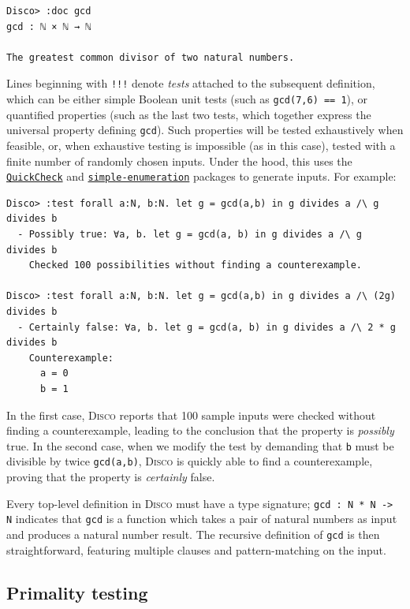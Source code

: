 \documentclass[copyright,creativecommons,12pt]{eptcs}
\newcommand{\disco}{\textsc{Disco}\xspace}
\newcommand{\pkg}[1]{\href{https://hackage.haskell.org/package/#1}{\texttt{#1}}}
\begin{document}
\begin{verbatim}
Disco> :doc gcd
gcd : ℕ × ℕ → ℕ

The greatest common divisor of two natural numbers.

\end{verbatim}

Lines beginning with \texttt{!!!} denote \emph{tests} attached to the
subsequent definition, which can be either simple Boolean unit tests
(such as \verb|gcd(7,6) == 1|), or quantified properties (such as the
last two tests, which together express the universal property defining
\verb|gcd|).  Such properties will be tested exhaustively when
feasible, or, when exhaustive testing is impossible (as in this case),
tested with a finite number of randomly chosen inputs. Under the hood,
this uses the \pkg{QuickCheck} \cite{claessen2000quickcheck} and
\pkg{simple-enumeration} packages to generate inputs.  For example:

\begin{verbatim}
Disco> :test forall a:N, b:N. let g = gcd(a,b) in g divides a /\ g divides b
  - Possibly true: ∀a, b. let g = gcd(a, b) in g divides a /\ g divides b
    Checked 100 possibilities without finding a counterexample.

Disco> :test forall a:N, b:N. let g = gcd(a,b) in g divides a /\ (2g) divides b
  - Certainly false: ∀a, b. let g = gcd(a, b) in g divides a /\ 2 * g divides b
    Counterexample:
      a = 0
      b = 1
\end{verbatim}

In the first case, \disco reports that 100 sample inputs were checked
without finding a counterexample, leading to the conclusion that the
property is \emph{possibly} true.  In the second case, when we modify
the test by demanding that \verb|b| must be divisible by twice
\verb|gcd(a,b)|, \disco is quickly able to find a counterexample,
proving that the property is \emph{certainly} false.

Every top-level definition in \disco must have a type signature;
\verb|gcd : N * N -> N| indicates that \verb|gcd| is a function which
takes a pair of natural numbers as input and produces a natural number
result.  The recursive definition of \verb|gcd| is then
straightforward, featuring multiple clauses and pattern-matching on
the input.

\subsection{Primality testing}
\label{sec:primetest}
\end{document}
